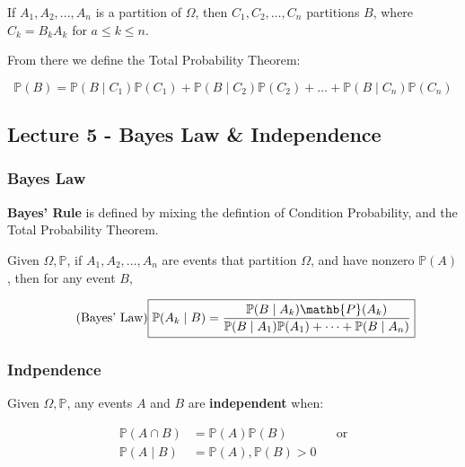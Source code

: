 \documentclass{article}
\begin{document}
If $A_1, A_2, \dots, A_n$ is a partition of $\Omega$, then $C_1, C_2,
\dots, C_n$ partitions $B$, where $C_k = B_k A_k$ for $a \leq k \leq
n$.

From there we define the Total Probability Theorem:

\begin{equation}
  \tag{Total Probability Theorem}
  \boxed{
    \mathbb{P}(B) = \mathbb{P}(B \mid C_1) \mathbb{P}(C_1) +
    \mathbb{P}(B \mid C_2) \mathbb{P}(C_2) + \dots + \mathbb{P}(B \mid
    C_n) \mathbb{P}(C_n)
  }
\end{equation}


\medskip\hline
\subsection{Lecture 5 - Bayes Law \& Independence}

\subsubsection{Bayes Law}

\textbf{Bayes' Rule} is defined by mixing the defintion of Condition
Probability, and the Total Probability Theorem.

Given $\Omega, \mathbb{P}$, if $A_1, A_2, \dots, A_n$ are events that
partition $\Omega$, and have nonzero $\mathbb{P}(A)$, then for any
event $B$,

\begin{equation}
  \tag{Bayes' Law}
  \boxed{
    \mathbb{P}(A_k \mid B) =
    \frac{\mathbb{P}(B \mid A_k) \mathb{P}(A_k)}
    {\mathbb{P}(B \mid A_1) \mathbb{P}(A_1) + \dots + \mathbb{P}(B
      \mid A_n)}
  }
\end{equation}

\subsubsection{Indpendence}

Given $\Omega, \mathbb{P}$, any events $A$ and $B$ are
\textbf{independent} when:

\begin{equation}
  \tag{Independence Def}
  \boxed{
    \begin{aligned}
      \mathbb{P}(A \cap B)
      &= \mathbb{P}(A) \mathbb{P}(B)
      && \text{or} \\
      \mathbb{P}(A \mid B)
      &= \mathbb{P}(A), \mathbb{P}(B) > 0
    \end{aligned}
  }
\end{equation}
\end{document}
